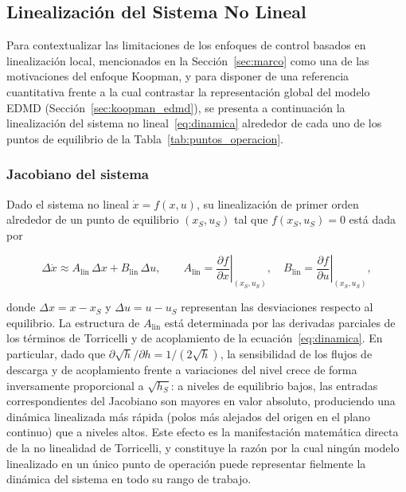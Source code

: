 \documentclass[12pt,letterpaper]{article}
\begin{document}
\subsection{Linealización del Sistema No Lineal}
\label{sec:linealizacion}

Para contextualizar las limitaciones de los enfoques de control basados en
linealización local, mencionados en la Sección~\ref{sec:marco} como una de las
motivaciones del enfoque Koopman, y para disponer de una referencia cuantitativa
frente a la cual contrastar la representación global del modelo EDMD
(Sección~\ref{sec:koopman_edmd}), se presenta a continuación la linealización del
sistema no lineal~\eqref{eq:dinamica} alrededor de cada uno de los puntos de
equilibrio de la Tabla~\ref{tab:puntos_operacion}.

\subsubsection*{Jacobiano del sistema}

Dado el sistema no lineal $\dot{x} = f(x,u)$, su linealización de primer orden
alrededor de un punto de equilibrio $(x_S, u_S)$ tal que $f(x_S,u_S)=0$ está dada por

\begin{equation}
\Delta\dot{x} \approx A_{\mathrm{lin}}\,\Delta x + B_{\mathrm{lin}}\,\Delta u,
\qquad
A_{\mathrm{lin}} = \left.\frac{\partial f}{\partial x}\right|_{(x_S,u_S)}, \quad
B_{\mathrm{lin}} = \left.\frac{\partial f}{\partial u}\right|_{(x_S,u_S)},
\label{eq:jacobiano}
\end{equation}

donde $\Delta x = x - x_S$ y $\Delta u = u - u_S$ representan las desviaciones
respecto al equilibrio. La estructura de $A_{\mathrm{lin}}$ está determinada por las
derivadas parciales de los términos de Torricelli y de acoplamiento de la
ecuación~\eqref{eq:dinamica}. En particular, dado que
$\partial\sqrt{h}/\partial h = 1/(2\sqrt{h})$, la sensibilidad de los flujos de
descarga y de acoplamiento frente a variaciones del nivel crece de forma inversamente
proporcional a $\sqrt{h_S}$: a niveles de equilibrio bajos, las entradas
correspondientes del Jacobiano son mayores en valor absoluto, produciendo una
dinámica linealizada más rápida (polos más alejados del origen en el plano continuo)
que a niveles altos. Este efecto es la manifestación matemática directa de la
no linealidad de Torricelli, y constituye la razón por la cual ningún modelo
linealizado en un único punto de operación puede representar fielmente la dinámica
del sistema en todo su rango de trabajo.
\end{document}

